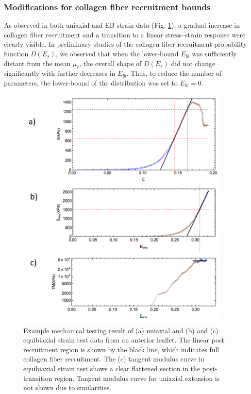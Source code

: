     
\subsubsection{Modifications for collagen fiber recruitment bounds}

    As observed in both uniaxial and EB strain data (Fig. \ref{c2:fig:3}), a gradual increase in collagen fiber recruitment and a transition to a linear stress–strain response were clearly visible. In preliminary studies of the collagen fiber recruitment probability function $D(E_s)$, we observed that when the lower-bound $E_{lb}$ was sufficiently distant from the mean $\mu_r$, the overall shape of $D(E_s)$ did not change significantly with further decreases in $E_{lb}$. Thus, to reduce the number of parameters, the lower-bound of the distribution was set to $E_{lb} = 0$.
    
    
\begin{figure}
\centering
\includegraphics[width=0.95\textwidth]{Images/chapter2/figure3.pdf}
\caption{Example mechanical testing result of (a) uniaxial and (b) and (c) equibiaxial strain test data from an anterior leaflet. The linear post recruitment region is shown by the black line, which indicates full collagen fiber recruitment. The (c) tangent modulus curve in equibiaxial strain test shows a clear flattened section in the post-transition region. Tangent modulus curve for uniaxial extension is not shown due to similarities.}
\label{c2:fig:3}
\end{figure}




